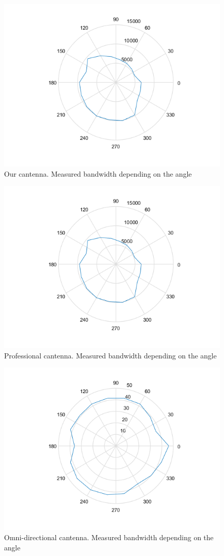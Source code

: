 \begin{figure}
	\includegraphics[width=\textwidth]{plots/polar_can_b.png}
	\caption{Our cantenna. Measured bandwidth depending on the angle}
	\label{img:ang:band:can}
\end{figure}
\begin{figure}
	\includegraphics[width=\textwidth]{plots/polar_prof_b.png}
	\caption{Professional cantenna. Measured bandwidth depending on the angle}
	\label{img:ang:band:prof}
\end{figure}
\begin{figure}
	\includegraphics[width=\textwidth]{plots/polar_omni_p.png}
	\caption{Omni-directional cantenna. Measured bandwidth depending on the angle}
	\label{img:ang:band:omni}
\end{figure}

